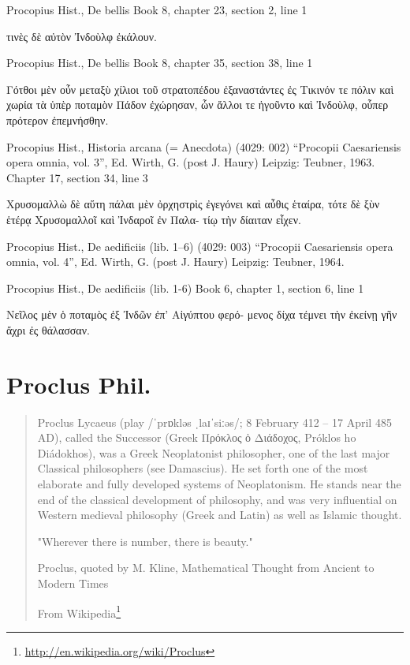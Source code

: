 \documentclass[12pt,letterpaper,twoside,final]{memoir}
\begin{document}
\begin{greek}
Procopius Hist., De bellis 
Book 8, chapter 23, section 2, line 1

       τινὲς δὲ αὐτὸν Ἰνδοὺλφ ἐκάλουν. 



Procopius Hist., De bellis 
Book 8, chapter 35, section 38, line 1

       Γότθοι μὲν οὖν μεταξὺ χίλιοι τοῦ στρατοπέδου 
ἐξαναστάντες ἐς Τικινόν τε πόλιν καὶ χωρία τὰ ὑπὲρ 
ποταμὸν Πάδον ἐχώρησαν, ὧν ἄλλοι τε ἡγοῦντο καὶ   
Ἰνδοὺλφ, οὗπερ πρότερον ἐπεμνήσθην. 



Procopius Hist., Historia arcana (= Anecdota) (4029: 002)
“Procopii Caesariensis opera omnia, vol. 3”, Ed. Wirth, G. (post J. Haury)
Leipzig: Teubner, 1963.
Chapter 17, section 34, line 3

                                             Χρυσομαλλὼ 
δὲ αὕτη πάλαι μὲν ὀρχηστρὶς ἐγεγόνει καὶ αὖθις ἑταίρα, 
τότε δὲ ξὺν ἑτέρᾳ Χρυσομαλλοῖ καὶ Ἰνδαροῖ ἐν Παλα-
τίῳ τὴν δίαιταν εἶχεν. 



Procopius Hist., De aedificiis (lib. 1–6) (4029: 003)
“Procopii Caesariensis opera omnia, vol. 4”, Ed. Wirth, G. (post J. Haury)
Leipzig: Teubner, 1964.


Procopius Hist., De aedificiis (lib. 1-6) 
Book 6, chapter 1, section 6, line 1

Νεῖλος μὲν ὁ ποταμὸς ἐξ Ἰνδῶν ἐπ' Αἰγύπτου φερό-
μενος δίχα τέμνει τὴν ἐκείνῃ γῆν ἄχρι ἐς θάλασσαν. 
\end{greek}



\section{Proclus Phil.}

\blockquote[From Wikipedia\footnote{\url{http://en.wikipedia.org/wiki/Proclus}}]{Proclus Lycaeus (play /ˈprɒkləs ˌlaɪˈsiːəs/; 8 February 412 – 17 April 485 AD), called the Successor (Greek Πρόκλος ὁ Διάδοχος, Próklos ho Diádokhos), was a Greek Neoplatonist philosopher, one of the last major Classical philosophers (see Damascius). He set forth one of the most elaborate and fully developed systems of Neoplatonism. He stands near the end of the classical development of philosophy, and was very influential on Western medieval philosophy (Greek and Latin) as well as Islamic thought.

        "Wherever there is number, there is beauty."

    Proclus, quoted by M. Kline, Mathematical Thought from Ancient to Modern Times }
\end{document}
